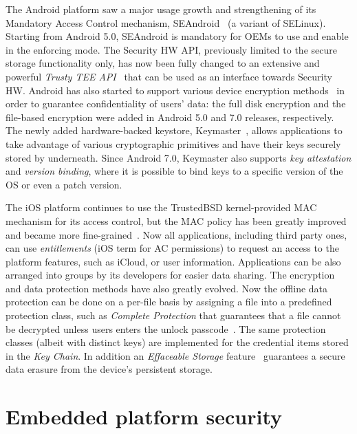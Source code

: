 The Android platform saw a major usage growth and strengthening of its Mandatory Access Control mechanism, SEAndroid~\cite{smalley12} (a variant of SELinux). Starting from Android 5.0, SEAndroid is mandatory for OEMs to use and enable in the enforcing mode. The Security HW API, previously limited to the secure storage functionality only, has now been fully changed to an extensive and powerful \textit{Trusty TEE API}~\cite{trusty} that can be used as an interface towards Security HW. Android has also started to support various device encryption methods~\cite{androidencr} in order to guarantee confidentiality of users' data: the full disk encryption and the file-based encryption were added in Android 5.0 and 7.0 releases, respectively. The newly added hardware-backed keystore, Keymaster~\cite{androidkeymaster}, allows applications to take advantage of various cryptographic primitives and have their keys securely stored by underneath. Since Android 7.0, Keymaster also supports \textit{key attestation} and \textit{version binding}, where it is possible to bind keys to a specific version of the OS or even a patch version. 

The iOS platform continues to use the TrustedBSD kernel-provided MAC mechanism for its access control, but the MAC policy has been greatly improved and became more fine-grained~\cite{iOS11}.  Now all applications, including third party ones, can use \textit{entitlements} (iOS term for AC permissions) to request an access to the platform features, such as iCloud, or user information. Applications can be also arranged into groups by its developers for easier data sharing. The encryption and data protection methods have also greatly evolved. Now the offline data protection can be done on a per-file basis by assigning a file into a predefined protection class, such as \textit{Complete Protection} that guarantees that a file cannot be decrypted unless users enters the unlock passcode~\cite{iOS11}. The same protection classes (albeit with distinct keys) are implemented for the credential items stored in the \textit{Key Chain}. In addition an \textit{Effaceable Storage} feature~\cite{iOS11} guarantees a secure data erasure from the device's persistent storage. 

\section{Embedded platform security}

